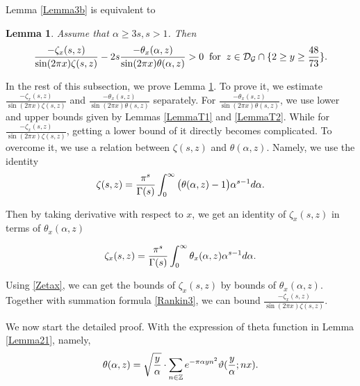 \documentclass[reqno,english]{amsart}
\newtheorem{lemma}{Lemma}[section]
\newtheorem{open problem}{Open Problem}[section]
\newtheorem{open question}{Open Question}[section]
\newtheorem{open questions on hexagonal lattice}{Open Questions on hexagonal lattice}[section]
\begin{document}
Lemma \ref{Lemma3b} is equivalent to

\begin{lemma}\label{Lemma3b1} Assume that $\alpha\geq 3s, s>1$. Then
\begin{equation}\aligned\nonumber
\frac{-\zeta_x(s,z)}{\sin(2\pi x)\zeta(s,z)}-2s\frac{-\theta_x(\alpha,z)}{\sin(2\pi x)\theta(\alpha,z)}>0\;\;\hbox{for}\;\;z\in\mathcal{D}_{\mathcal{G}}\cap\{2\geq y\geq \frac{48}{73}\}.
 \endaligned\end{equation}

\end{lemma}

In the rest of this subsection, we prove Lemma \ref{Lemma3b1}.
To prove it, we estimate $\frac{-\zeta_x(s,z)}{\sin(2\pi x)\zeta(s,z)}$
and $\frac{-\theta_x(s,z)}{\sin(2\pi x)\theta(s,z)}$ separately.
For $\frac{-\theta_x(s,z)}{\sin(2\pi x)\theta(s,z)}$, we use lower and upper bounds given by Lemmas \ref{LemmaT1} and \ref{LemmaT2}.
While for $\frac{-\zeta_x(s,z)}{\sin(2\pi x)\zeta(s,z)}$, getting a lower bound of it directly becomes complicated.
To overcome it, we use a relation between $\zeta(s,z)$ and $\theta(\alpha,z)$. Namely, we use the identity
 \begin{equation}\aligned\nonumber
\zeta(s,z)=\frac{\pi^s}{\Gamma(s)}\int_0^\infty \big(\theta(\alpha,z)-1\big)\alpha^{s-1}d\alpha.
\endaligned\end{equation}

Then by taking derivative with respect to $x$, we get an identity of $\zeta_x(s,z)$ in terms of $\theta_x(\alpha,z)$

 \begin{equation}\aligned\label{Zetax}
\zeta_x(s,z)=\frac{\pi^s}{\Gamma(s)}\int_0^\infty \theta_x(\alpha,z)\alpha^{s-1}d\alpha.
\endaligned\end{equation}


Using \eqref{Zetax}, we can get the bounds of $\zeta_x(s,z)$ by bounds of $\theta_x(\alpha,z)$. Together with summation formula
\eqref{Rankin3}, we can bound $\frac{-\zeta_x(s,z)}{\sin(2\pi x)\zeta(s,z)}$.




We now start the detailed proof.
With the expression of theta function in Lemma \ref{Lemma21}, namely,
 \begin{equation}\aligned\label{CM300}
\theta(\alpha,z)=\sqrt{\frac{y}{\alpha}}\cdot\sum_{n\in\mathbb{Z}} e^{-\pi\alpha yn^2}\vartheta(\frac{y}{\alpha};nx)
.
\endaligned\end{equation}
\end{document}
